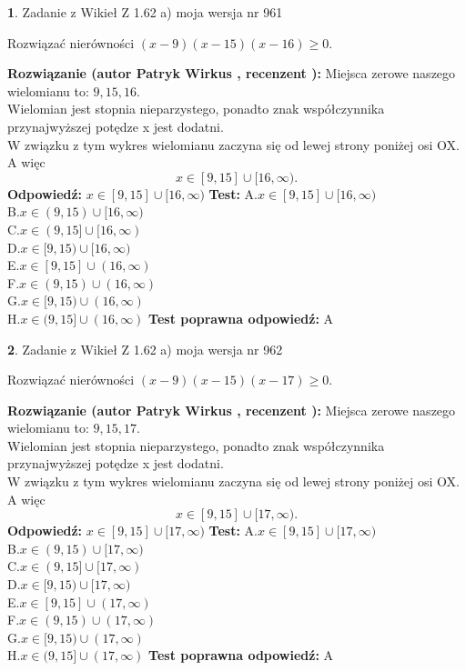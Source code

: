 \documentclass[12pt, a4paper]{article}
\theoremstyle{definition} %
\newtheorem{zad}{}
\newcommand{\zadStart}[1]{\begin{zad}#1\newline}
\newcommand{\zadStop}{\end{zad}}
\newcommand{\rozwStart}[2]{\noindent \textbf{Rozwiązanie (autor #1 , recenzent #2): }\newline}
\newcommand{\rozwStop}{\newline}
\newcommand{\odpStart}{\noindent \textbf{Odpowiedź:}\newline}
\newcommand{\odpStop}{\newline}
\newcommand{\testStart}{\noindent \textbf{Test:}\newline}
\newcommand{\testStop}{\newline}
\newcommand{\kluczStart}{\noindent \textbf{Test poprawna odpowiedź:}\newline}
\newcommand{\kluczStop}{\newline}
\begin{document}
\zadStart{Zadanie z Wikieł Z 1.62 a) moja wersja nr 961}

Rozwiązać nierówności $(x-9)(x-15)(x-16)\ge0$.
\zadStop
\rozwStart{Patryk Wirkus}{}
Miejsca zerowe naszego wielomianu to: $9, 15, 16$.\\
Wielomian jest stopnia nieparzystego, ponadto znak współczynnika przy\linebreak najwyższej potędze x jest dodatni.\\ W związku z tym wykres wielomianu zaczyna się od lewej strony poniżej osi OX. A więc $$x \in [9,15] \cup [16,\infty).$$
\rozwStop
\odpStart
$x \in [9,15] \cup [16,\infty)$
\odpStop
\testStart
A.$x \in [9,15] \cup [16,\infty)$\\
B.$x \in (9,15) \cup [16,\infty)$\\
C.$x \in (9,15] \cup [16,\infty)$\\
D.$x \in [9,15) \cup [16,\infty)$\\
E.$x \in [9,15] \cup (16,\infty)$\\
F.$x \in (9,15) \cup (16,\infty)$\\
G.$x \in [9,15) \cup (16,\infty)$\\
H.$x \in (9,15] \cup (16,\infty)$
\testStop
\kluczStart
A
\kluczStop



\zadStart{Zadanie z Wikieł Z 1.62 a) moja wersja nr 962}

Rozwiązać nierówności $(x-9)(x-15)(x-17)\ge0$.
\zadStop
\rozwStart{Patryk Wirkus}{}
Miejsca zerowe naszego wielomianu to: $9, 15, 17$.\\
Wielomian jest stopnia nieparzystego, ponadto znak współczynnika przy\linebreak najwyższej potędze x jest dodatni.\\ W związku z tym wykres wielomianu zaczyna się od lewej strony poniżej osi OX. A więc $$x \in [9,15] \cup [17,\infty).$$
\rozwStop
\odpStart
$x \in [9,15] \cup [17,\infty)$
\odpStop
\testStart
A.$x \in [9,15] \cup [17,\infty)$\\
B.$x \in (9,15) \cup [17,\infty)$\\
C.$x \in (9,15] \cup [17,\infty)$\\
D.$x \in [9,15) \cup [17,\infty)$\\
E.$x \in [9,15] \cup (17,\infty)$\\
F.$x \in (9,15) \cup (17,\infty)$\\
G.$x \in [9,15) \cup (17,\infty)$\\
H.$x \in (9,15] \cup (17,\infty)$
\testStop
\kluczStart
A
\kluczStop
\end{document}

